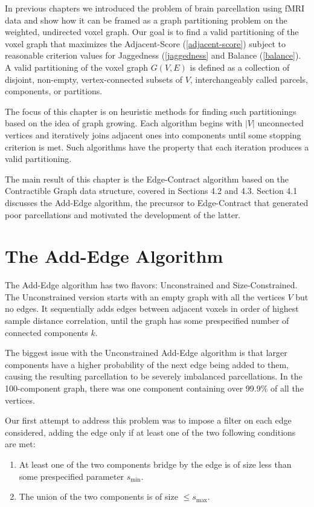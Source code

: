 In previous chapters we introduced the problem of brain parcellation
using fMRI data and show how it can be framed as a graph partitioning
problem on the weighted, undirected voxel graph. Our goal is to find a
valid partitioning of the voxel graph that maximizes the Adjacent-Score
(\ref{adjacent-score}) subject to reasonable criterion values for
Jaggedness (\ref{jaggedness} and Balance (\ref{balance}). A valid
partitioning of the voxel graph $G(V, E)$ is defined as a collection of
disjoint, non-empty, vertex-connected subsets of $V$, interchangeably
called parcels, components, or partitions.

The focus of this chapter is on heuristic methods for finding such
partitionings based on the idea of graph growing. Each algorithm begins
with $|V|$ unconnected vertices and iteratively joins adjacent ones into
components until some stopping criterion is met. Such algorithms have
the property that each iteration produces a valid partitioning.

The main result of this chapter is the Edge-Contract algorithm based on
the Contractible Graph data structure, covered in Sections 4.2 and 4.3.
Section 4.1 discusses the Add-Edge algorithm, the precursor to
Edge-Contract that generated poor parcellations and motivated the
development of the latter.

\section{The Add-Edge Algorithm}

The Add-Edge algorithm has two flavors: Unconstrained and
Size-Constrained. The Unconstrained version starts with an empty graph
with all the vertices $V$ but no edges. It sequentially adds edges
between adjacent voxels in order of highest sample distance
correlation, until the graph has some prespecified number of connected
components $k$.

The biggest issue with the Unconstrained Add-Edge algorithm is that
larger components have a higher probability of the next edge being
added to them, causing the resulting parcellation to be severely
imbalanced parcellations. In the 100-component graph, there was one
component containing over 99.9\% of all the vertices.

Our first attempt to address this problem was to impose a filter on
each edge considered, adding the edge only if at least one of the two
following conditions are met:

\begin{enumerate}[1.]
\item
At least one of the two components bridge by the edge is of size less
than some prespecified parameter $s_{\min}$.

\item
The union of the two components is of size $\leq s_{\max}$.
\end{enumerate}

